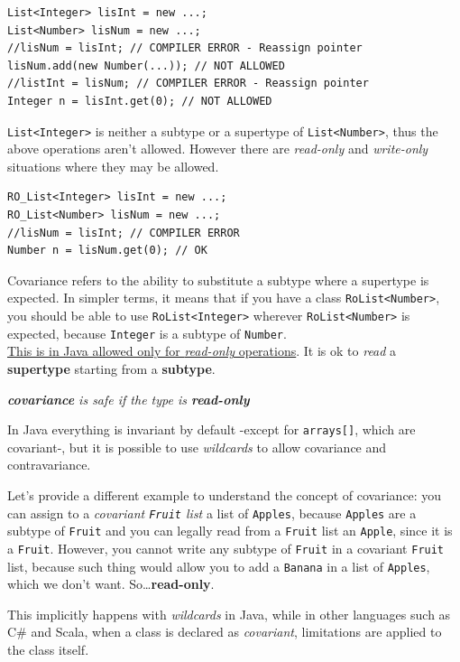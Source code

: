 \begin{lstlisting}
List<Integer> lisInt = new ...;
List<Number> lisNum = new ...;
//lisNum = lisInt; // COMPILER ERROR - Reassign pointer
lisNum.add(new Number(...)); // NOT ALLOWED
//listInt = lisNum; // COMPILER ERROR - Reassign pointer
Integer n = lisInt.get(0); // NOT ALLOWED
\end{lstlisting}

\lstinline|List<Integer>| is neither a subtype or a supertype of \lstinline|List<Number>|,
thus the above operations aren't allowed.
However there are \textit{read-only} and \textit{write-only} situations where they may be allowed.

\begin{lstlisting}
RO_List<Integer> lisInt = new ...;
RO_List<Number> lisNum = new ...;
//lisNum = lisInt; // COMPILER ERROR
Number n = lisNum.get(0); // OK
\end{lstlisting}
Covariance refers to the ability to substitute a subtype where a supertype is expected. In simpler terms, it means that if you have a class \lstinline|RoList<Number>|, you should be able to use \lstinline|RoList<Integer>| wherever \lstinline|RoList<Number>| is expected, because \lstinline|Integer| is a subtype of \lstinline|Number|.\\
\ul{This is in Java allowed only for \textit{read-only} operations}.
It is ok to \textit{read} a \textbf{supertype} starting from a \textbf{subtype}.
\begin{center}
   \textit{\textbf{covariance} is safe if the type is \textbf{read-only}}
\end{center}

In Java everything is invariant by default -except for \lstinline|arrays[]|, which are covariant-, but it is possible to use \textit{wildcards} to allow covariance and contravariance.

Let's provide a different example to understand the concept of covariance:
you can assign to a \textit{covariant \texttt{Fruit} list} a list of \texttt{Apples}, because \texttt{Apples} are a subtype of \texttt{Fruit} and you can legally read from a \texttt{Fruit} list an \texttt{Apple}, since it is a \texttt{Fruit}.
However, you cannot write any subtype of \texttt{Fruit} in a covariant \texttt{Fruit} list, because such thing would allow you to add a \texttt{Banana} in a list of \texttt{Apples}, which we don't want. So\dots \textbf{read-only}.

This implicitly happens with \textit{wildcards} in Java, while in other languages such as C\# and Scala, when a class is declared as \textit{covariant}, limitations are applied to the class itself.

